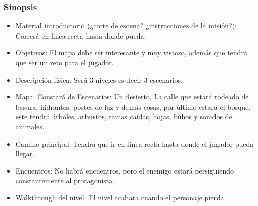 \subsubsection{Sinopsis}
\begin{itemize}
	\item Material introductorio (¿corte de escena? ¿instrucciones de la misión?):
	      Correrá en linea recta hasta donde pueda.
	\item Objetivos:
	      El mapa debe ser interesante y muy vistoso, además que tendrá que ser un reto
	      para el jugador.
	\item Descripción física:
	      Será 3 niveles es decir 3 escenarios.
	\item Mapa:
	      Constará de Escenarios: Un desierto,
	      La calle que estará rodeado de basura, hidrantes, postes de luz y demás cosas, por
	      último estará el bosque. este tendrá árboles, arbustos, ramas caídas, hojas, búhos y
	      sonidos de animales.
	\item Camino principal:
	      Tendrá que ir en linea recta hasta donde el jugador pueda llegar.
	\item Encuentros:
	      No habrá encuentros, pero el enemigo estará persiguiendo constantemente al protagonista.
	\item Walkthrough del nivel:
	      El nivel acabara cuando el personaje pierda.

\end{itemize}
